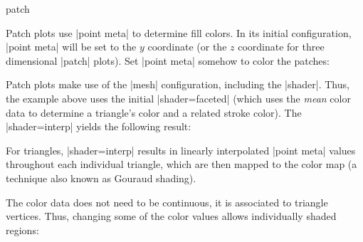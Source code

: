 {\begin{plottype}[/pgfplots]{patch}
\begin{codeexample}[]
\end{codeexample}
	\noindent Patch plots use |point meta| to determine fill colors. In its initial configuration, |point meta| will be set to the $y$ coordinate (or the $z$ coordinate for three dimensional |patch| plots). Set |point meta| somehow to color the patches:
\begin{codeexample}[]
\end{codeexample}
	Patch plots make use of the |mesh| configuration, including the |shader|. Thus, the example above uses the initial |shader=faceted| (which uses the \emph{mean} color data to determine a triangle's color and a related stroke color). The |shader=interp| yields the following result:
\begin{codeexample}[]
\end{codeexample}
	\noindent For triangles, |shader=interp| results in linearly interpolated |point meta| values throughout each individual triangle, which are then mapped to the color map (a technique also known as Gouraud shading).

	The color data does not need to be continuous, it is associated to triangle vertices. Thus, changing some of the color values allows individually shaded regions:
\begin{codeexample}[]
\end{codeexample}
\end{plottype}}

